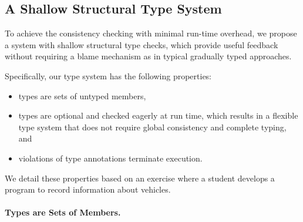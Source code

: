 



\subsection{A Shallow Structural Type System}

To achieve the consistency checking with minimal run-time overhead,
we propose a system with shallow structural type checks,
which provide useful feedback without requiring a blame mechanism
as in typical gradually typed approaches.


Specifically, our type system has the following properties:

\begin{itemize}
  \item types are sets of untyped members,
  \item types are optional and checked eagerly at run time,
        which results in a flexible type system that does not require global
        consistency and complete typing, and
  \item violations of type annotations terminate execution.
\end{itemize}


We detail these properties
based on an exercise where a student develops
a program to record information about vehicles.

\paragraph{Types are Sets of Members.}

